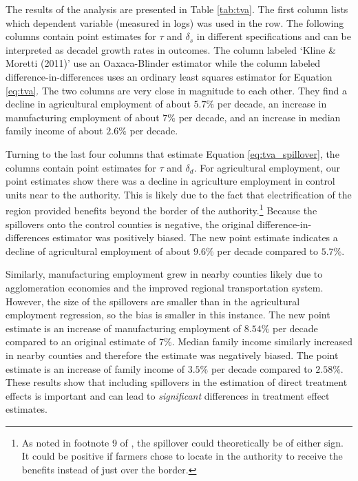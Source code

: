 \documentclass[11pt]{article}
\begin{document}
The results of the analysis are presented in Table \ref{tab:tva}. The first column lists which dependent variable (measured in logs) was used in the row. The following columns contain point estimates for $\tau$ and $\delta_s$ in different specifications and can be interpreted as decadel growth rates in outcomes. The column labeled `Kline \& Moretti (2011)' use an Oaxaca-Blinder estimator while the column labeled difference-in-differences uses an ordinary least squares estimator for Equation \ref{eq:tva}. The two columns are very close in magnitude to each other. They find a decline in agricultural employment of about $5.7\%$ per decade, an increase in manufacturing employment of about $7\%$ per decade, and an increase in median family income of about $2.6\%$ per decade. 

Turning to the last four columns that estimate Equation \ref{eq:tva_spillover}, the columns contain point estimates for $\tau$ and $\delta_d$. For agricultural employment, our point estimates show there was a decline in agriculture employment in control units near to the authority. This is likely due to the fact that electrification of the region provided benefits beyond the border of the authority.\footnote{As noted in footnote 9 of \citet{Kline_Moretti_2014}, the spillover could theoretically be of either sign. It could be positive if farmers chose to locate in the authority to receive the benefits instead of just over the border.} Because the spillovers onto the control counties is negative, the original difference-in-differences estimator was positively biased. The new point estimate indicates a decline of agricultural employment of about $9.6\%$ per decade compared to $5.7\%$. 

Similarly, manufacturing employment grew in nearby counties likely due to agglomeration economies and the improved regional transportation system. However, the size of the spillovers are smaller than in the agricultural employment regression, so the bias is smaller in this instance. The new point estimate is an increase of manufacturing employment of $8.54\%$ per decade compared to an original estimate of $7\%$. Median family income similarly increased in nearby counties and therefore the estimate was negatively biased. The point estimate is an increase of family income of $3.5\%$ per decade compared to $2.58\%$. These results show that including spillovers in the estimation of direct treatment effects is important and can lead to \emph{significant} differences in treatment effect estimates. 
\end{document}
